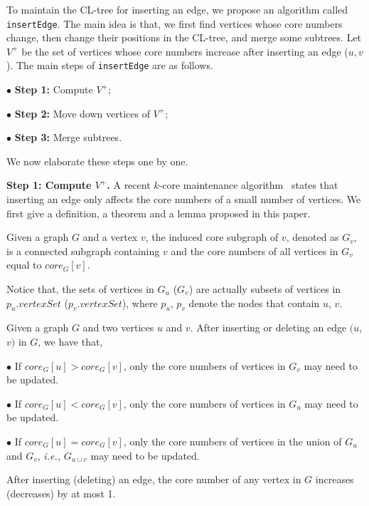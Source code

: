 To maintain the CL-tree for inserting an edge, we propose an algorithm called {\tt insertEdge}.
The main idea is that, we first find vertices whose core numbers change, then change their positions in the CL-tree, and merge some subtrees. Let $V^+$ be the set of vertices whose core numbers increase after inserting an edge ($u,v$).
The main steps of {\tt insertEdge} are as follows.

$\bullet$ \textbf{Step 1:} Compute $V^+$;

$\bullet$ \textbf{Step 2:} Move down vertices of $V^+$;

$\bullet$ \textbf{Step 3:} Merge subtrees.

We now elaborate these steps one by one.

\textbf{Step 1: Compute $V^+$.}
A recent $k$-core maintenance algorithm~\cite{kcoreUpdate} states that inserting an edge only affects the core numbers of a small number of vertices. We first give a definition, a theorem and a lemma proposed in this paper.

\begin{definition}
\label{df:inducedgraph}
Given a graph $G$ and a vertex $v$, the induced core subgraph of $v$, denoted as $G_v$, is a connected subgraph containing $v$ and the core numbers of all vertices in $G_v$ equal to $core_{G}[v]$.
\end{definition}

Notice that, the sets of vertices in $G_u$ ($G_v$) are actually subsets of vertices in $p_u.vertexSet$ ($p_v.vertexSet$),
where $p_u$, $p_v$ denote the nodes that contain $u$, $v$.

\begin{theorem}
\label{thrm:kcoreupdate}
Given a graph $G$ and two vertices $u$ and $v$. After inserting or deleting an edge $(u$,$v)$ in $G$, we have that,

$\bullet$ If $core_G[u] > core_G[v]$, only the core numbers of vertices in $G_v$ may need to be updated.

$\bullet$ If $core_G[u] < core_G[v]$, only the core numbers of vertices in $G_u$ may need to be updated.

$\bullet$ If $core_G[u] = core_G[v]$, only the core numbers of vertices in the union of $G_u$ and $G_v$, \textit{i.e.,} $G_{u\cup v}$ may need to be updated.
\end{theorem}

\begin{lemma}
\label{lm:kcorelemma}
After inserting (deleting) an edge, the core number of any vertex in $G$ increases (decreases) by at most 1.
\end{lemma}

